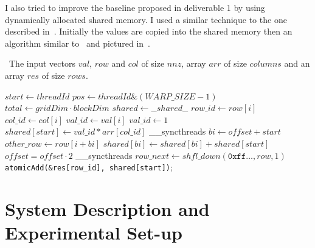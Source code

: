 \documentclass[conference]{IEEEtran}
\begin{document}
I also tried to improve the baseline proposed in deliverable 1 by using dynamically allocated shared memory. I used a similar technique to the one described in~. Initially the values are copied into the shared memory then an algorithm similar to~ and pictured in~.

\begin{algorithm}[ht]
\caption{Prefix-sum with WARP level primitives}
\algorithmicrequire~The input vectors \(val\), \(row\) and \(col\) of size \(nnz\), array \(arr\) of size \(columns\) and an array \(res\) of size \(rows\).
\begin{algorithmic}[1]\label{alg:share}
  \State\(start\gets threadId\)
  \State\(pos\gets threadId\&(WARP\_SIZE - 1)\)
  \State\(total\gets gridDim\cdot blockDim\)
   \State\(shared\gets \_\_shared\_\_\)
    \State\(row\_id\gets row[i]\)
    \State\(col\_id\gets col[i]\)
    \State\(val\_id\gets val[i]\)
    \State\(val\_id\gets 1\)
    \State\(shared[start]\gets val\_id * arr[col\_id]\)
      \State\_\_syncthreads
      \State\(bi\gets offset + start\)
      \State\(other\_row\gets row[i+bi]\)
        \State\(shared[bi]\gets shared[bi] + shared[start]\)
      \EndIf%
      \State\(offset = offset\cdot 2\)
    \EndFor%
    \State\_\_syncthreads
    \State\(row\_next\gets shfl\_down(\texttt{0xff}\dots, row, 1)\)
      \State\texttt{atomicAdd(\&res[row\_id], shared[start])};
    \EndIf%
  \EndFor%
\EndProcedure%
\end{algorithmic}
\end{algorithm}


\section{System Description and Experimental Set-up}
\end{document}
